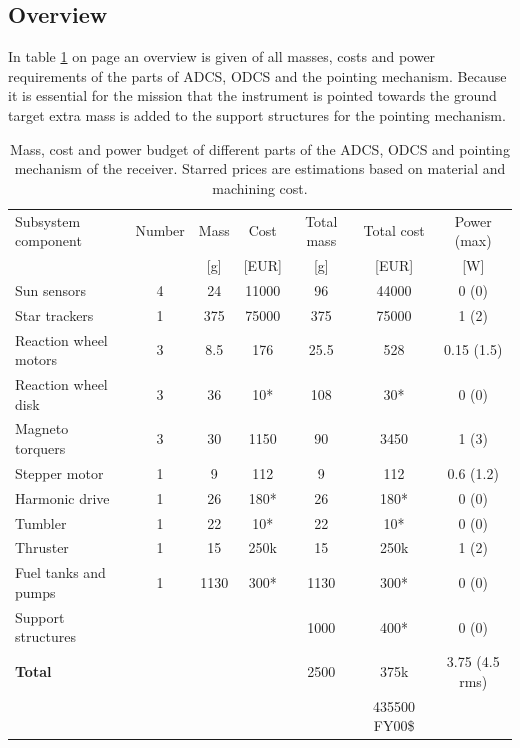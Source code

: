 \subsection{Overview}
\label{ss:recDDoverview}
In table \ref{tab:adcspointbudgetreceiver} on page \pageref{tab:adcspointbudgetreceiver} an overview is given of all masses, costs and power requirements of the parts of \ac{ADCS}, \ac{ODCS} and the pointing mechanism. Because it is essential for the mission that the instrument is pointed towards the ground target extra mass is added to the support structures for the pointing mechanism.
\begin{table}[h]
\begin{tabular}{l | c | c c | c c | c }
Subsystem component    & Number & Mass & Cost & Total mass & Total cost & Power (max)\\ 
                       &   & [g] & [EUR]& [g]  &[EUR] & [W]         \\ \hline \hline
Sun sensors            & 4 & 24  & 11000& 96   & 44000&  0 (0)      \\
Star trackers          & 1 & 375 & 75000& 375  & 75000&  1 (2)      \\ \hline
Reaction wheel motors  & 3 & 8.5 & 176  & 25.5 & 528  &  0.15 (1.5) \\
Reaction wheel disk    & 3 & 36  & 10*  & 108  & 30*  &  0 (0)      \\
Magneto torquers       & 3 & 30  & 1150 & 90   & 3450 &  1 (3)      \\ \hline
Stepper motor          & 1 & 9   & 112  & 9    & 112  &  0.6 (1.2)  \\
Harmonic drive         & 1 & 26  & 180* & 26   & 180* &  0 (0)      \\ 
Tumbler                & 1 & 22  & 10*  & 22   & 10*  &  0 (0)      \\ \hline
Thruster			   & 1 & 15  & 250k & 15   & 250k &  1 (2)      \\
Fuel tanks and pumps   & 1 & 1130 & 300*& 1130  & 300*  & 0 (0)      \\ \hline
Support structures     &	&	 &	    & 1000  & 400* & 0 (0) \\ \hline
\textbf{Total} & & &                             & 2500  & 375k & 3.75 (4.5 rms) \\
&&&&& 435500 FY00\$ &
\end{tabular}
\caption[Mass, cost and power budget of AODCS and pointing mechanism receiver]{Mass, cost and power budget of different parts of the \ac{ADCS}, \ac{ODCS} and pointing mechanism of the receiver. Starred prices are estimations based on material and machining cost.}
\label{tab:adcspointbudgetreceiver}
\end{table}